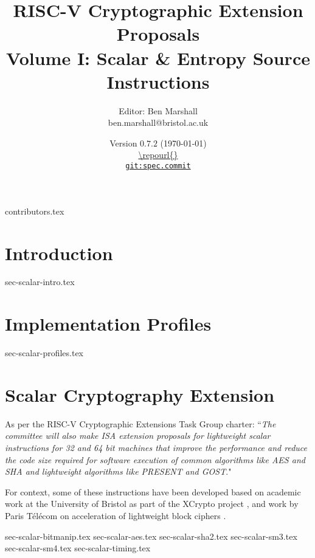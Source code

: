 \documentclass[11pt]{article}
\title{RISC-V Cryptographic Extension Proposals\\Volume I: Scalar \& Entropy Source Instructions}
\author{Editor: Ben Marshall\\ben.marshall@bristol.ac.uk}
\date{Version $0.7.2$ (\today) \\
\medskip
\url{\repourl{}} \\
\href{\repourl{}}{
{\small \tt git:{spec.commit}}}
}
\begin{document}

\maketitle

{contributors.tex}

\tableofcontents


\newpage
\section{Introduction}
\label{sec:intro}
{sec-scalar-intro.tex}

\newpage
\section{Implementation Profiles}
\label{sec:profiles}
{sec-scalar-profiles.tex}

\clearpage
\section{Scalar Cryptography Extension}
\label{sec:scalar}

As per the RISC-V Cryptographic Extensions Task Group charter:
``{\em The committee will also make ISA extension proposals for lightweight
scalar instructions for 32 and 64 bit machines that improve the performance
and reduce the code size required for software execution of common algorithms
like AES and SHA and lightweight algorithms like PRESENT and GOST}."

\bigskip

For context, some of these instructions have been developed based on academic
work at the University of Bristol as part of the XCrypto project
\cite{MPP:19},
and work by
Paris T\'{e}l\'{e}com on acceleration of lightweight block ciphers
\cite{TGMGD:19}.



{sec-scalar-bitmanip.tex}
{sec-scalar-aes.tex}
\clearpage
{sec-scalar-sha2.tex}
{sec-scalar-sm3.tex}
{sec-scalar-sm4.tex}
\clearpage
{sec-scalar-timing.tex}
\end{document}
